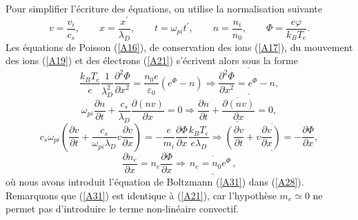 \documentclass[10pt,thmsa]{article}
\begin{document}
Pour simplifier l'\'{e}criture des \'{e}quations, on utilise la normalisation
suivante
\begin{equation}
v=\frac{v_{i}}{c_{s}},\qquad x=\frac{x^{\prime}}{\lambda_{D}},\qquad
t=\omega_{pi}t^{\prime},\qquad n=\frac{n_{i}}{n_{0}},\qquad\Phi=\frac
{e\varphi}{k_{B}T_{e}}.\label{A27}%
\end{equation}
Les \'{e}quations de Poisson (\ref{A16}), de conservation des ions
(\ref{A17}), du mouvement des ions (\ref{A19}) et des \'{e}lectrons
(\ref{A21}) s'\'{e}crivent alors sous la forme
\begin{equation}
\frac{k_{B}T_{e}}{e}\frac{1}{\lambda_{D}^{2}}\frac{\partial^{2}\Phi}{\partial
x^{2}}=\frac{n_{0}e}{\varepsilon_{0}}(e^{\Phi}-n)\Rightarrow
\underline{\overline{\frac{\partial^{2}\Phi}{\partial x^{2}}=e^{\Phi}-n,}%
}\label{A28}%
\end{equation}
\begin{equation}
\omega_{pi}\frac{\partial n}{\partial t}+\frac{c_{s}}{\lambda_{D}}%
\frac{\partial(nv)}{\partial x}=0\Rightarrow\overline{\underline{\frac
{\partial n}{\partial t}+\frac{\partial(nv)}{\partial x}=0,}}\label{A29}%
\end{equation}
\begin{equation}
c_{s}\omega_{pi}\left(  \frac{\partial v}{\partial t}+\frac{c_{s}}{\omega
_{pi}\lambda_{D}}v\frac{\partial v}{\partial x}\right)  =-\frac{e}{m_{i}}%
\frac{\partial\Phi}{\partial x}\frac{k_{B}T_{e}}{e\lambda_{D}}\Rightarrow
\underline{\overline{\left(  \frac{\partial v}{\partial t}+v\frac{\partial
v}{\partial x}\right)  =-\frac{\partial\Phi}{\partial x},}}\label{A30}%
\end{equation}
\begin{equation}
\frac{\partial n_{e}}{\partial x}=n_{e}\frac{\partial\Phi}{\partial
x}\Rightarrow\overline{\underline{\frac{{}}{{}}n_{e}=n_{0}e^{\Phi}\frac{{}}%
{{}},}}\label{A31}%
\end{equation}
o\`{u} nous avons introduit l'\'{e}quation de Boltzmann (\ref{A31}) dans
(\ref{A28}). Remarquons que (\ref{A31}) est identique \`{a} (\ref{A21}), car
l'hypoth\`{e}se $m_{e}\simeq0$ ne permet pas d'introduire le terme
non-lin\'{e}aire convectif.
\end{document}
